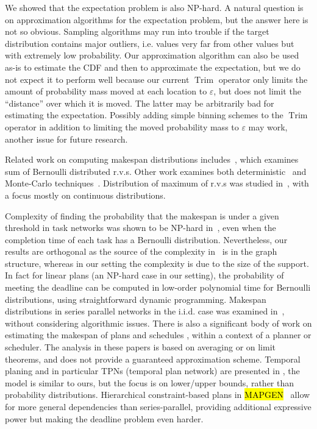 \documentclass{article}
\DeclareMathOperator{\Trim}{Trim}
\begin{document}
We showed that the expectation problem is also NP-hard.
A natural question is on approximation algorithms for the expectation problem, but the answer here is not so obvious.
Sampling algorithms may run into trouble if the target distribution contains major outliers, i.e. values very far from
other values but with extremely low probability. Our approximation algorithm can also be used as-is to estimate
the CDF and then to approximate the expectation, but we do not expect it to perform well because our current $\Trim$
operator only limits the amount of probability mass moved at each location to $\varepsilon$, but does not limit the
``distance'' over which it is moved. The latter may be arbitrarily bad for estimating the expectation.
Possibly adding simple binning schemes to the $\Trim$ operator in addition to limiting the moved probability mass to $\varepsilon$
may work, another issue for future research. 

Related work on computing makespan distributions includes~\cite{hong2013computing}, which examines sum of  Bernoulli distributed r.v.s.
Other work examines both deterministic~\cite{mercier2007discrete} and  Monte-Carlo techniques~\cite{bucher1988adaptive,lipton1990practical}. 
Distribution of maximum of r.v.s was studied in~\cite{devroye1980generating}, with a focus mostly on continuous distributions.

Complexity of finding the probability that the makespan is under a given threshold in task networks was shown to
be NP-hard in~\cite{hagstrom1988computational}, even when the completion time of each task has a Bernoulli distribution.
Nevertheless, our results are orthogonal as the source of the complexity in~\cite{hagstrom1988computational} is in the graph structure,
whereas in our setting the complexity is due to the size of the support. In fact for linear plans (an NP-hard case in our setting),
the probability of meeting the deadline can be computed in low-order polynomial time for Bernoulli distributions, using straightforward dynamic programming.
Makespan distributions in series parallel networks in the i.i.d. case was examined in~\cite{gutjahr1992average}, without   
considering algorithmic issues. There is also a significant body of work on estimating the makespan of plans and schedules
\cite{herroelen2005project,fu2010towards,beck2007proactive}, within a context of a planner or scheduler. The analysis in these papers is
based on averaging or on limit theorems, and does not provide a guaranteed approximation scheme. 
Temporal planing and in particular TPNs (temporal plan network) are presented in
\cite{kim2001executing}, the model is similar to ours, but the focus is on lower/upper bounds, rather than probability distributions. 
Hierarchical constraint-based plans in \hl{MAPGEN}~\cite{bresina2005mixed} allow for more
general dependencies than series-parallel, providing additional expressive power but making the deadline problem even harder.
\end{document}
